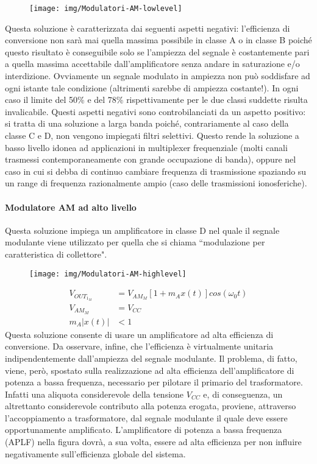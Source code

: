 \begin{figure}[hbt]
\centering
\texttt{[image: img/Modulatori-AM-lowlevel]}
\caption{}
\label{fig:modulatori-am-lowlevel}
\end{figure}

Questa soluzione è caratterizzata dai seguenti aspetti negativi: l'efficienza di conversione non sarà
mai quella massima possibile in classe A o in classe B poiché questo risultato è conseguibile solo se
l'ampiezza del segnale è costantemente pari a quella massima accettabile dall'amplificatore senza
andare in saturazione e/o interdizione. Ovviamente un segnale modulato in ampiezza non può
soddisfare ad ogni istante tale condizione (altrimenti sarebbe di ampiezza costante!). In ogni caso il
limite del 50\% e del 78\% rispettivamente per le due classi suddette risulta invalicabile.
Questi aspetti negativi sono controbilanciati da un aspetto positivo: si tratta di una soluzione a larga
banda poiché, contrariamente al caso della classe C e D, non vengono impiegati filtri selettivi.
Questo rende la soluzione a basso livello idonea ad applicazioni in multiplexer frequenziale (molti
canali trasmessi contemporaneamente con grande occupazione di banda), oppure nel caso in cui si
debba di continuo cambiare frequenza di trasmissione spaziando su un range di frequenza
razionalmente ampio (caso delle trasmissioni ionosferiche).

\paragraph{Modulatore AM ad alto livello}
Questa soluzione impiega un amplificatore in classe D nel quale il segnale modulante viene
utilizzato per quella che si chiama ``modulazione per caratteristica di collettore".
\begin{figure}[hbt]
\centering
\texttt{[image: img/Modulatori-AM-highlevel]}
\caption{}
\label{fig:modulatori-am-highlevel}
\end{figure}
\begin{align*}
V_{OUT_{1_M}}&=V_{AM_M}\left[ 1 + m_A x(t)\right]cos(\omega_0t)\\
V_{AM_M} &= V_{CC} \\
m_A |x(t)|  & < 1
\end{align*}
Questa soluzione consente di usare un amplificatore ad alta efficienza di conversione. Da osservare,
infine, che l'efficienza è virtualmente unitaria indipendentemente dall'ampiezza del segnale
modulante. Il problema, di fatto, viene, però, spostato sulla realizzazione ad alta efficienza
dell'amplificatore di potenza a bassa frequenza, necessario per pilotare il
primario del trasformatore. Infatti una aliquota considerevole della tensione $V_{CC}$ e, di conseguenza,
un altrettanto considerevole contributo alla potenza erogata, proviene, attraverso l'accoppiamento a
trasformatore, dal segnale modulante il quale deve essere opportunamente amplificato.
L'amplificatore di potenza a bassa frequenza (APLF) nella figura dovrà, a sua volta, essere ad alta
efficienza per non influire negativamente sull'efficienza globale del sistema.

